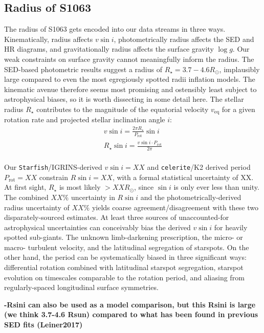 \documentclass[modern,trackchanges]{aastex631}
\newcommand\natalienote[1]{\textbf{{\color{orange}#1}}}
\begin{document}
\subsection{Radius of S1063}

The radius of S1063 gets encoded into our data streams in three ways.  Kinematically, radius affects $v\sin{i}$, photometrically radius affects the SED and HR diagrams, and gravitationally radius affects the surface gravity $\log{g}$.  Our weak constraints on surface gravity cannot meaningfully inform the radius.  The SED-based photometric results suggest a radius of $R_{\star} = 3.7-4.6 R_\odot$, implausibly large compared to even the most egregiously spotted radii inflation models.  The kinematic avenue therefore seems most promising and ostensibly least subject to astrophysical biases, so it is worth dissecting in some detail here.  The stellar radius $R_{\star}$ contributes to the magnitude of the equatorial velocity $v_{\mathrm{eq}}$ for a given rotation rate and projected stellar inclination angle $i$:
\begin{eqnarray}
  v \sin{i} = \frac{2\pi R_{\star}}{P_{\mathrm{rot}}} \sin{i} \\
  R_{\star} \sin{i} = \frac{v \sin{i} \cdot P_{\mathrm{rot}}}{2 \pi} \\
\end{eqnarray}

Our \texttt{Starfish}/IGRINS-derived $v\sin{i}=XX$ and \texttt{celerite}/K2 derived period $P_{\mathrm{rot}}=XX$ constrain $R\sin{i} = XX$, with a formal statistical uncertainty of XX.  At first sight, $R_{\star}$ is most likely $>XX R_{\odot}$, since $\sin{i}$ is only ever less than unity.  The combined $XX\%$ uncertainty in $R\sin{i}$ and the photometrically-derived radius uncertainty of $XX\%$ yields coarse agreement/disagreement with these two disparately-sourced estimates. At least three sources of unaccounted-for astrophysical uncertainties can conceivably bias the derived $v\sin{i}$ for heavily spotted sub-giants.  The unknown limb-darkening prescription, the micro- or macro- turbulent velocity, and the latitudinal segregation of starspots.  On the other hand, the period can be systematically biased in three significant ways: differential rotation combined with latitudinal starspot segregation, starspot evolution on timescales comparable to the rotation period, and aliasing from regularly-spaced longitudinal surface symmetries.

\natalienote{
-Rsini can also be used as a model comparison, but this Rsini is large (we think 3.7-4.6 Rsun) compared to what has been found in previous SED fits (Leiner2017)}
\end{document}

